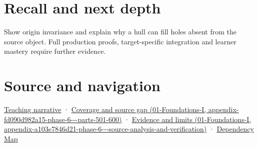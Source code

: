 \section{Recall and next depth}\label{appendix-0026ec42c9d5-recall-and-next-depth}

Show origin invariance and explain why a hull can fill holes absent from the source object. Full production proofs, target-specific integration and learner mastery require further evidence.

\section{Source and navigation}\label{appendix-0026ec42c9d5-source-and-navigation}

\href{Continuous\%20Notes/Computing\%20Foundations\%20-\%20From\%20Bits\%20to\%20C++\%20and\%20Systems\%20APIs\#Weighted\%20points\%20lead\%20from\%20affine\%20geometry\%20to\%20collision\%20shapes}{Teaching narrative} · \href{../01-Foundations-I/main.pdf\#nameddest=appendix-fd090d982a15-phase-6---parts-501-600}{Coverage and source gap (01-Foundations-I, appendix-fd090d982a15-phase-6-\/-\/-parts-501-600)} · \href{../01-Foundations-I/main.pdf\#nameddest=appendix-a103e7846d21-phase-6---source-analysis-and-verification}{Evidence and limits (01-Foundations-I, appendix-a103e7846d21-phase-6-\/-\/-source-analysis-and-verification)} · \hyperref[appendix-4ad47bdd269a]{Dependency Map}
